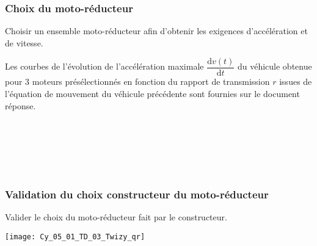 \subsubsection*{Choix du moto-réducteur}
\begin{obj}
Choisir un ensemble moto-réducteur afin d’obtenir les exigences d’accélération et de vitesse.
\end{obj}

Les courbes de l’évolution de l’accélération maximale $\dfrac{\text{d} v(t)}{\text{d} t}$
du véhicule obtenue pour 3 moteurs présélectionnés en fonction du rapport de transmission $r$ issues de l’équation de mouvement du véhicule précédente sont fournies sur le document réponse.




\ifprof
\begin{corrige}~\\
\end{corrige}
\else
\fi


\ifprof
\begin{corrige}~\\
\end{corrige}
\else
\fi


\ifprof
\begin{corrige}~\\
\end{corrige}
\else
\fi


\subsubsection*{Validation du choix constructeur du moto-réducteur}
\begin{obj}
Valider le choix du moto-réducteur fait par le constructeur.
\end{obj}

\ifprof
\else
\begin{marginfigure}
\centering
\texttt{[image: Cy\_05\_01\_TD\_03\_Twizy\_qr]}
\end{marginfigure}
\fi

